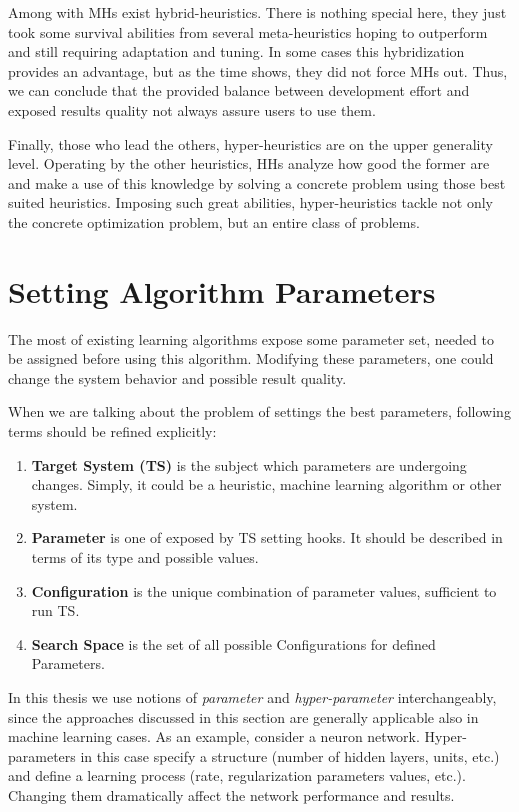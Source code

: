 Among with MHs exist hybrid-heuristics. There is nothing special here, they just took some survival abilities from several meta-heuristics hoping to outperform and still requiring adaptation and tuning. In some cases this hybridization provides an advantage, but as the time shows, they did not force MHs out. Thus, we can conclude that the provided balance between development effort and exposed results quality not always assure users to use them.

Finally, those who lead the others, hyper-heuristics are on the upper generality level. 
Operating by the other heuristics, HHs analyze how good the former are and make a use of this knowledge by solving a concrete problem using those best suited heuristics. Imposing such great abilities, hyper-heuristics tackle not only the concrete optimization problem, but an entire class of problems.


\section{Setting Algorithm Parameters}\label{bg: section Parameters Setting}
The most of existing learning algorithms expose some parameter set, needed to be assigned before using this algorithm. Modifying these parameters, one could change the system behavior and possible result quality.

When we are talking about the problem of settings the best parameters, following terms should be refined explicitly:
\begin{enumerate}
	\item \textbf{Target System (TS)} is the subject which parameters are undergoing changes. Simply, it could be a heuristic, machine learning algorithm or other system.
	\item \textbf{Parameter} is one of exposed by TS setting hooks. It should be described in terms of its type and possible values.
	\item \textbf{Configuration} is the unique combination of parameter values, sufficient to run TS.
	\item \textbf{Search Space} is the set of all possible Configurations for defined Parameters.
\end{enumerate}

In this thesis we use notions of \textit{parameter} and \textit{hyper-parameter} interchangeably, since the approaches discussed in this section are generally applicable also in machine learning cases. As an example, consider a neuron network. Hyper-parameters in this case specify a structure (number of hidden layers, units, etc.) and define a learning process (rate, regularization parameters values, etc.). Changing them dramatically affect the network performance and results.

